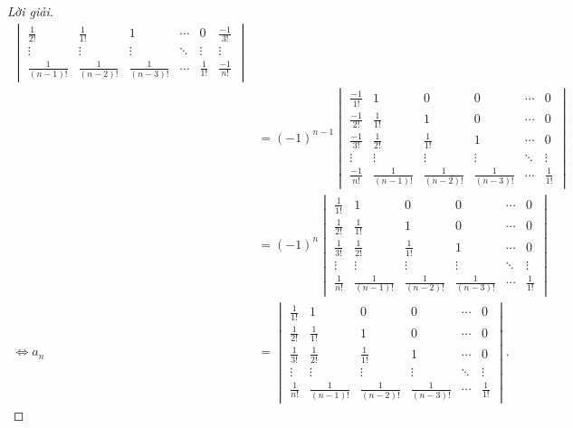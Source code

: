 \documentclass[class=linearalgebra,crop=false]{standalone}
\begin{document}
\begin{proof}[Lời giải]
\begin{align*}
\begin{vmatrix}
            \frac{1}{2!}     & \frac{1}{1!}     & 1                & \cdots & 0            & \frac{-1}{3!} \\
            \vdots           & \vdots           & \vdots           & \ddots & \vdots       & \vdots        \\
            \frac{1}{(n-1)!} & \frac{1}{(n-2)!} & \frac{1}{(n-3)!} & \cdots & \frac{1}{1!} & \frac{-1}{n!}
        \end{vmatrix} \\
        & = (-1)^{n-1}
        \begin{vmatrix}
            \frac{-1}{1!}    & 1                & 0                & 0                & \cdots & 0            \\
            \frac{-1}{2!}    & \frac{1}{1!}     & 1                & 0                & \cdots & 0            \\
            \frac{-1}{3!}    & \frac{1}{2!}     & \frac{1}{1!}     & 1                & \cdots & 0            \\
            \vdots           & \vdots           & \vdots           & \vdots           & \ddots & \vdots       \\
            \frac{-1}{n!}    & \frac{1}{(n-1)!} & \frac{1}{(n-2)!} & \frac{1}{(n-3)!} & \cdots & \frac{1}{1!}
        \end{vmatrix} \\
        & = (-1)^{n}
        \begin{vmatrix}
            \frac{1}{1!}    & 1                & 0                & 0                & \cdots & 0            \\
            \frac{1}{2!}    & \frac{1}{1!}     & 1                & 0                & \cdots & 0            \\
            \frac{1}{3!}    & \frac{1}{2!}     & \frac{1}{1!}     & 1                & \cdots & 0            \\
            \vdots           & \vdots           & \vdots           & \vdots           & \ddots & \vdots       \\
            \frac{1}{n!}    & \frac{1}{(n-1)!} & \frac{1}{(n-2)!} & \frac{1}{(n-3)!} & \cdots & \frac{1}{1!}
        \end{vmatrix} \\
        \Longleftrightarrow a_{n} & =
        \begin{vmatrix}
            \frac{1}{1!}    & 1                & 0                & 0                & \cdots & 0            \\
            \frac{1}{2!}    & \frac{1}{1!}     & 1                & 0                & \cdots & 0            \\
            \frac{1}{3!}    & \frac{1}{2!}     & \frac{1}{1!}     & 1                & \cdots & 0            \\
            \vdots           & \vdots           & \vdots           & \vdots           & \ddots & \vdots       \\
            \frac{1}{n!}    & \frac{1}{(n-1)!} & \frac{1}{(n-2)!} & \frac{1}{(n-3)!} & \cdots & \frac{1}{1!}
        \end{vmatrix}.
    \end{align*}


\end{proof}
\end{document}
